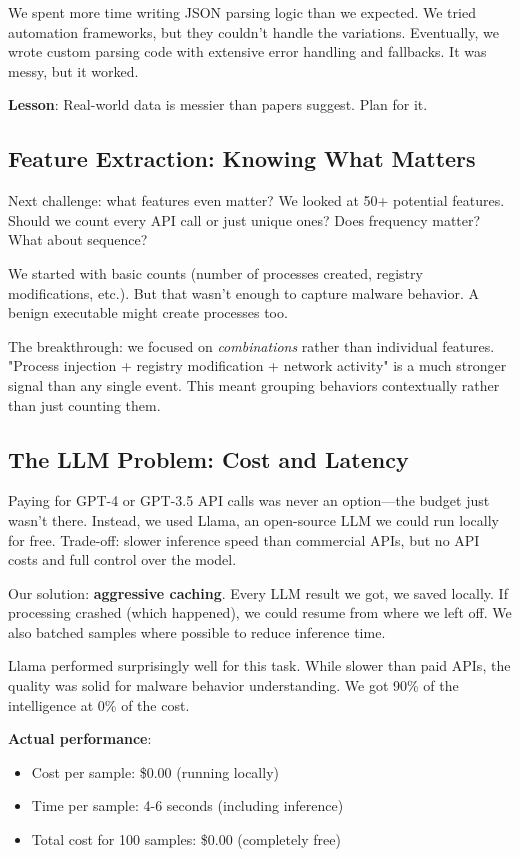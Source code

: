 \documentclass[11pt]{article}
\begin{document}
We spent more time writing JSON parsing logic than we expected. We tried automation frameworks, but they couldn't handle the variations. Eventually, we wrote custom parsing code with extensive error handling and fallbacks. It was messy, but it worked.

\textbf{Lesson}: Real-world data is messier than papers suggest. Plan for it.

\subsection{Feature Extraction: Knowing What Matters}

Next challenge: what features even matter? We looked at 50+ potential features. Should we count every API call or just unique ones? Does frequency matter? What about sequence?

We started with basic counts (number of processes created, registry modifications, etc.). But that wasn't enough to capture malware behavior. A benign executable might create processes too.

The breakthrough: we focused on \textit{combinations} rather than individual features. "Process injection + registry modification + network activity" is a much stronger signal than any single event. This meant grouping behaviors contextually rather than just counting them.

\subsection{The LLM Problem: Cost and Latency}

Paying for GPT-4 or GPT-3.5 API calls was never an option—the budget just wasn't there. Instead, we used Llama, an open-source LLM we could run locally for free. Trade-off: slower inference speed than commercial APIs, but no API costs and full control over the model.

Our solution: \textbf{aggressive caching}. Every LLM result we got, we saved locally. If processing crashed (which happened), we could resume from where we left off. We also batched samples where possible to reduce inference time.

Llama performed surprisingly well for this task. While slower than paid APIs, the quality was solid for malware behavior understanding. We got 90\% of the intelligence at 0\% of the cost.

\textbf{Actual performance}:
\begin{itemize}
    \item Cost per sample: \$0.00 (running locally)
    \item Time per sample: 4-6 seconds (including inference)
    \item Total cost for 100 samples: \$0.00 (completely free)
\end{itemize}
\end{document}
